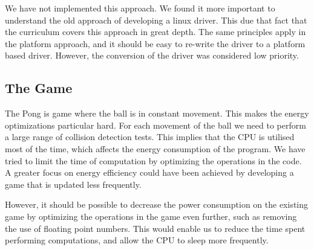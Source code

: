 We have not implemented this approach. We found it more important to understand the old approach of developing a linux driver. This due that fact that the curriculum covers this approach in great depth. The same principles apply in the platform approach, and it should be easy to re-write the driver to a platform based driver. However, the conversion of the driver was considered low priority.


\subsection{The Game}
The Pong is game where the ball is in constant movement. This makes the energy optimizations particular hard. For each movement of the ball we need to perform a large range of collision detection tests. This implies that the CPU is utilised most of the time, which affects the energy consumption of the program. We have tried to limit the time of computation by optimizing the operations in the code. A greater focus on energy efficiency could have been achieved by developing a game that is updated less frequently. 

However, it should be possible to decrease the power consumption on the existing game by optimizing the operations in the game even further, such as removing the use of floating point numbers. This would enable us to reduce the time spent performing computations, and allow the CPU to sleep more frequently. 